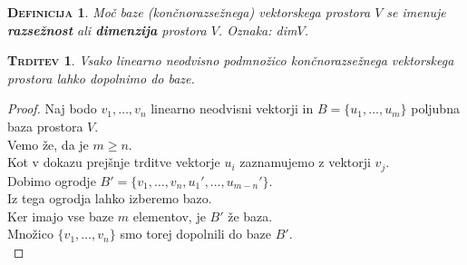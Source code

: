 \documentclass[a4paper,12pt]{article}
\newtheorem*{trditev}{\textsc{Trditev}}
\newtheorem*{definicija}{\textsc{Definicija}}
\begin{document}
\begin{definicija}
Moč baze (končnorazsežnega) vektorskega prostora $V$ se imenuje \textbf{razsežnost} ali \textbf{dimenzija} prostora $V$. Oznaka: dim$V$. \\
\end{definicija}

\begin{trditev}
Vsako linearno neodvisno podmnožico končnorazsežnega vektorskega prostora lahko dopolnimo do baze.\\
\end{trditev}

\begin{proof}
Naj bodo $v_1,\ldots,v_n$ linearno neodvisni vektorji in $B=\{u_1,\ldots,u_m\}$ poljubna baza prostora $V$. \\

Vemo že, da je $m \geq n$. \\

Kot v dokazu prejšnje trditve vektorje $u_i$ zaznamujemo z vektorji $v_j$. \\

Dobimo ogrodje $B'=\{v_1,\ldots,v_n,u_1',\ldots,u_{m-n}'\}$. \\

Iz tega ogrodja lahko izberemo bazo.\\

Ker imajo vse baze $m$ elementov, je $B'$ že baza.\\

 Množico $\{v_1,\ldots,v_n\}$ smo torej dopolnili do baze $B'$. \\
\end{proof}
\end{document}
